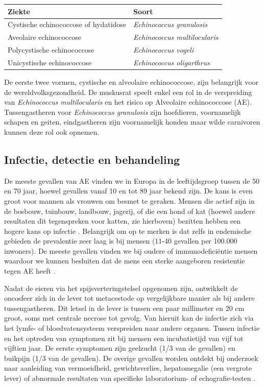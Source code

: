 \documentclass[twoside]{extreport}
\begin{document}
\begin{longtable}[]{@{}ll@{}}
\toprule
Ziekte & Soort\tabularnewline
\midrule
\endhead
Cystische echinococcose of hydatidose & \emph{Echinococcus
granulosis}\tabularnewline
Aveolaire echinococcose & \emph{Echinococcus
multilocularis}\tabularnewline
Polycystische echinococcose & \emph{Echinococcus vogeli}\tabularnewline
Unicystische echinococcose & \emph{Echinococcus
oligarthrus}\tabularnewline
\bottomrule
\end{longtable}

De eerste twee vormen, cystische en alveolaire echinococcose, zijn
belangrijk voor de wereldvolksgezondheid. De muskusrat speelt enkel een
rol in de verspreiding van \emph{Echinococcus multilocularis} en het
risico op Alveolaire echinococcose (AE). Tussengastheren voor
\emph{Echinococcus granulosis} zijn hoefdieren, voornamelijk schapen en
geiten, eindgastheren zijn voornamelijk honden maar wilde carnivoren
kunnen deze rol ook opnemen.

\subsection{Infectie, detectie en
behandeling}\label{infectie-detectie-en-behandeling}

De meeste gevallen van AE vinden we in Europa in de leeftijdsgroep
tussen de 50 en 70 jaar, hoewel gevallen vanaf 10 en tot 89 jaar bekend
zijn. De kans is even groot voor mannen als vrouwen om besmet te
geraken. Mensen die actief zijn in de bosbouw, tuinbouw, landbouw,
jagerij, of die een hond of kat (hoewel andere resultaten dit
tegenspreken voor katten, zie hierboven) bezitten hebben een hogere kans
op infectie
\citep{eckert2001oie, vuitton2015clinical, craig2017echinococcosis}.
Belangrijk om op te merken is dat zelfs in endemische gebieden de
prevalentie zeer laag is bij mensen (11-40 gevallen per 100.000
inwoners). De meeste gevallen vinden we bij oudere of immunodeficiëntie
mensen waardoor we kunnen besluiten dat de mens een sterke aangeboren
resistentie tegen AE heeft \citep{eckert2001oie}.

Nadat de eieren via het spijsverteringstelsel opgenomen zijn, ontwikkelt
de oncosfeer zich in de lever tot metacestode op vergelijkbare manier
als bij andere tussengastheren. Dit letsel in de lever is tussen een
paar millimeter en 20 cm groot, soms met centrale necrose tot gevolg.
Van hieruit kan de infectie zich via het lymfe- of bloedvatensysteem
verspreiden naar andere organen. Tussen infectie en het optreden van
symptomen zit bij mensen een incubatietijd van vijf tot vijftien jaar.
De eerste symptomen zijn geelzucht (1/3 van de gevallen) en buikpijn
(1/3 van de gevallen). De overige gevallen worden ontdekt bij onderzoek
naar aanleiding van vermoeidheid, gewichtsverlies, hepatomegalie (een
vergrote lever) of abnormale resultaten van specifieke laboratorium- of
echografie-testen \citep{eckert2001oie}.
\end{document}
